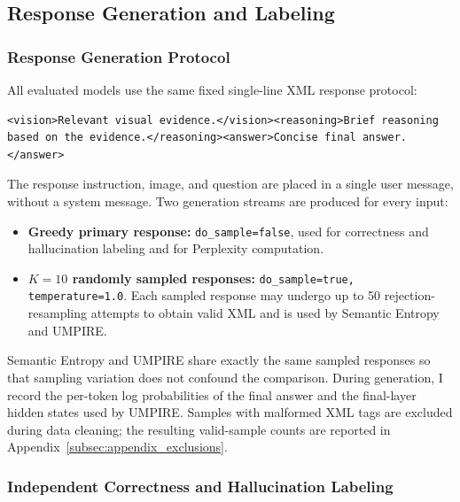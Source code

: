 \subsection{Response Generation and Labeling}

\subsubsection{Response Generation Protocol}
\label{subsubsec:generation_protocol}

All evaluated models use the same fixed single-line XML response protocol:

\begin{promptblock}
\begin{lstlisting}
<vision>Relevant visual evidence.</vision><reasoning>Brief reasoning based on the evidence.</reasoning><answer>Concise final answer.</answer>
\end{lstlisting}
\end{promptblock}

The response instruction, image, and question are placed in a single user message, without a system message. Two generation streams are produced for every input:

\begin{itemize}[leftmargin=2em]
    \item \textbf{Greedy primary response:} \texttt{do\_sample=false}, used for correctness and hallucination labeling and for Perplexity computation.
    \item \textbf{$K=10$ randomly sampled responses:} \texttt{do\_sample=true, temperature=1.0}. Each sampled response may undergo up to 50 rejection-resampling attempts to obtain valid XML and is used by Semantic Entropy and UMPIRE.
\end{itemize}

Semantic Entropy and UMPIRE share exactly the same sampled responses so that sampling variation does not confound the comparison. During generation, I record the per-token log probabilities of the final answer and the final-layer hidden states used by UMPIRE. Samples with malformed XML tags are excluded during data cleaning; the resulting valid-sample counts are reported in Appendix~\ref{subsec:appendix_exclusions}.

\subsubsection{Independent Correctness and Hallucination Labeling}
\label{subsubsec:independent_labels}

